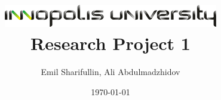 \documentclass[column]{report}
\begin{document}
\graphicspath{ {./images/} }

\title{\includegraphics{logo}\\Research Project 1}
\author{Emil Sharifullin, Ali Abdulmadzhidov}
\date{\today}

\maketitle
\tableofcontents
\listoffigures
\listoftables
\newpage






\end{document}
